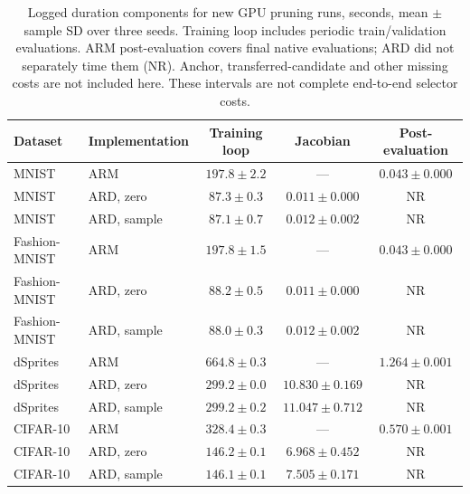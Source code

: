 \begin{table}[H]
\caption{Logged duration components for new GPU pruning runs, seconds, mean $\pm$ sample SD over three seeds. Training loop includes periodic train/validation evaluations. ARM post-evaluation covers final native evaluations; ARD did not separately time them (NR). Anchor, transferred-candidate and other missing costs are not included here. These intervals are not complete end-to-end selector costs.}\label{tab:newcost}
\small
\setlength{\tabcolsep}{3pt}
\begin{tabular*}{\textwidth}{@{\extracolsep{\fill}}llccc@{}}
\toprule
Dataset & Implementation & Training loop & Jacobian & Post-evaluation \\
\midrule
MNIST & ARM & $197.8 \pm 2.2$ & --- & $0.043 \pm 0.000$ \\
MNIST & ARD, zero & $87.3 \pm 0.3$ & $0.011 \pm 0.000$ & NR \\
MNIST & ARD, sample & $87.1 \pm 0.7$ & $0.012 \pm 0.002$ & NR \\
Fashion-MNIST & ARM & $197.8 \pm 1.5$ & --- & $0.043 \pm 0.000$ \\
Fashion-MNIST & ARD, zero & $88.2 \pm 0.5$ & $0.011 \pm 0.000$ & NR \\
Fashion-MNIST & ARD, sample & $88.0 \pm 0.3$ & $0.012 \pm 0.002$ & NR \\
dSprites & ARM & $664.8 \pm 0.3$ & --- & $1.264 \pm 0.001$ \\
dSprites & ARD, zero & $299.2 \pm 0.0$ & $10.830 \pm 0.169$ & NR \\
dSprites & ARD, sample & $299.2 \pm 0.2$ & $11.047 \pm 0.712$ & NR \\
CIFAR-10 & ARM & $328.4 \pm 0.3$ & --- & $0.570 \pm 0.001$ \\
CIFAR-10 & ARD, zero & $146.2 \pm 0.1$ & $6.968 \pm 0.452$ & NR \\
CIFAR-10 & ARD, sample & $146.1 \pm 0.1$ & $7.505 \pm 0.171$ & NR \\
\bottomrule\end{tabular*}
\end{table}
